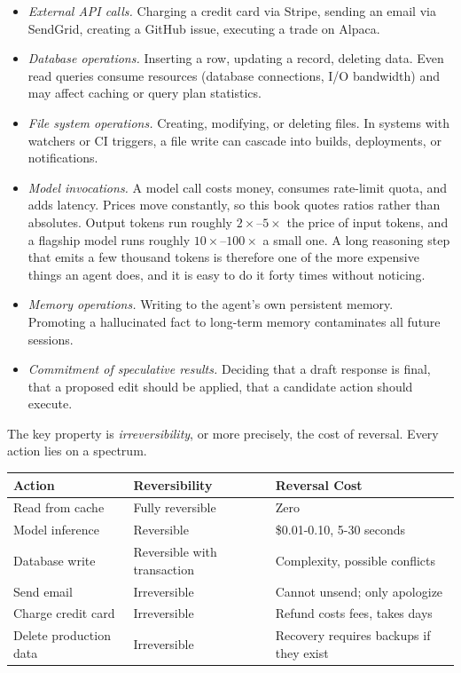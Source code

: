 \begin{itemize}
\item \textit{External API calls.} Charging a credit card via Stripe, sending an email via SendGrid, creating a GitHub issue, executing a trade on Alpaca.
\item \textit{Database operations.} Inserting a row, updating a record, deleting data. Even read queries consume resources (database connections, I/O bandwidth) and may affect caching or query plan statistics.
\item \textit{File system operations.} Creating, modifying, or deleting files. In systems with watchers or CI triggers, a file write can cascade into builds, deployments, or notifications.
\item \textit{Model invocations.} A model call costs money, consumes rate-limit quota, and adds latency. Prices move constantly, so this book quotes ratios rather than absolutes. Output tokens run roughly $2\times$--$5\times$ the price of input tokens, and a flagship model runs roughly $10\times$--$100\times$ a small one. A long reasoning step that emits a few thousand tokens is therefore one of the more expensive things an agent does, and it is easy to do it forty times without noticing.
\item \textit{Memory operations.} Writing to the agent's own persistent memory. Promoting a hallucinated fact to long-term memory contaminates all future sessions.
\item \textit{Commitment of speculative results.} Deciding that a draft response is final, that a proposed edit should be applied, that a candidate action should execute.
\end{itemize}

The key property is \textit{irreversibility}, or more precisely, the cost of reversal. Every action lies on a spectrum.

\begin{center}
\begin{tabular}{lll}
\toprule
Action & Reversibility & Reversal Cost \\
\midrule
Read from cache & Fully reversible & Zero \\
Model inference & Reversible & \$0.01-0.10, 5-30 seconds \\
Database write & Reversible with transaction & Complexity, possible conflicts \\
Send email & Irreversible & Cannot unsend; only apologize \\
Charge credit card & Irreversible & Refund costs fees, takes days \\
Delete production data & Irreversible & Recovery requires backups if they exist \\
\bottomrule
\end{tabular}
\end{center}

